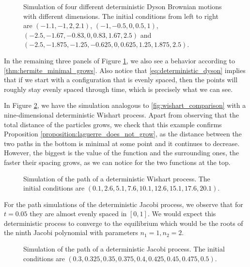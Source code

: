 \begin{figure}[h!] \centering 
    
    \caption{Simulation of four different deterministic Dyson Brownian motions with different dimensions. The initial conditions from left to right are $(-1.1,-1,2,2.1)$, $(-1, -0.5, 0, 0.5, 1)$, $(-2.5,-1.67,-0.83,0,0.83,1.67,2.5)$ and $(-2.5,-1.875,-1.25,-0.625,0,0.625,1.25,1.875,2.5)$. \label{fig:four_det_dyson}}
\end{figure}

In the remaining three panels of Figure \ref{fig:four_det_dyson}, we also see a behavior according to \ref{thm:hermite_minimal_grows}. Also notice that \eqref{eq:deterministic_dyson} implies that if we start with a configuration that is evenly spaced, then the points will roughly stay evenly spaced through time, which is precisely what we can see. 

In Figure \ref{fig:det_wishart}, we have the simulation analogous to \ref{fig:wishart_comparison} with a nine-dimensional deterministic Wishart process. Apart from observing that the total distance of the particles grows, we check that this example confirms Proposition \ref{proposition:laguerre_does_not_grow}, as the distance between the two paths in the bottom is minimal at some point and it continues to decrease. However, the biggest is the value of the function and the surrounding ones, the faster their spacing grows, as we can notice for the two functions at the top.

\begin{figure}[h!] \centering 
    
    \caption{Simulation of the path of a deterministic Wishart process. The initial conditions are $(0.1,2.6,5.1,7.6,10.1,12.6,15.1,17.6,20.1)$.\label{fig:det_wishart}}
\end{figure}

For the path simulations of the deterministic Jacobi process, we observe that for $t=0.05$ they are almost evenly spaced in $[0,1]$. We would expect this deterministic process to converge to the equilibrium which would be the roots of the ninth Jacobi polynomial with parameters $n_1 = 1, n_2 =2$. 

\begin{figure}[h!] \centering 
    
    \caption{Simulation of the path of a deterministic Jacobi process. The initial conditions are $(0.3,0.325,0.35,0.375,0.4,0.425,0.45,0.475,0.5)$.\label{fig:det_jacobi}}
\end{figure}

